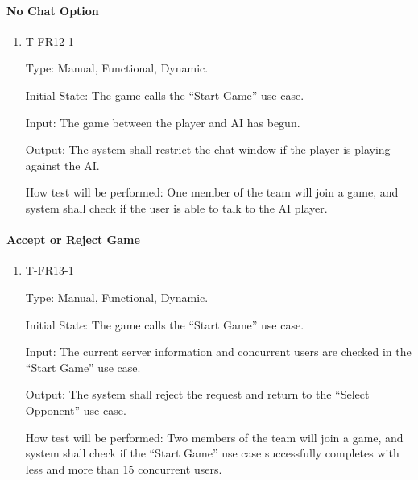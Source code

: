 \documentclass[12pt, titlepage]{article}
\begin{document}
    \paragraph{No Chat Option}

        \begin{enumerate}

        \item{T-FR12-1\\}

            Type: Manual, Functional, Dynamic.
            					
            Initial State: The game calls the ``Start Game'' use case.
            					
            Input: The game between the player and AI has begun.
            					
            Output: The system shall restrict the chat window if the player is playing against the AI.

            How test will be performed: One member of the team will join a game, and system shall check if the user is able to talk to the AI player.

        \end{enumerate}

    \paragraph{Accept or Reject Game}

        \begin{enumerate}

        \item{T-FR13-1\\}

            Type: Manual, Functional, Dynamic.
            					
            Initial State: The game calls the ``Start Game'' use case.
            					
            Input: The current server information and concurrent users are checked in the ``Start Game'' use case.
            					
            Output: The system shall reject
            the request and return to the “Select Opponent” use case.

            How test will be performed: Two members of the team will join a game, and system shall check if the ``Start Game'' use case successfully completes with less and more than 15 concurrent users.

        \end{enumerate}
\end{document}
